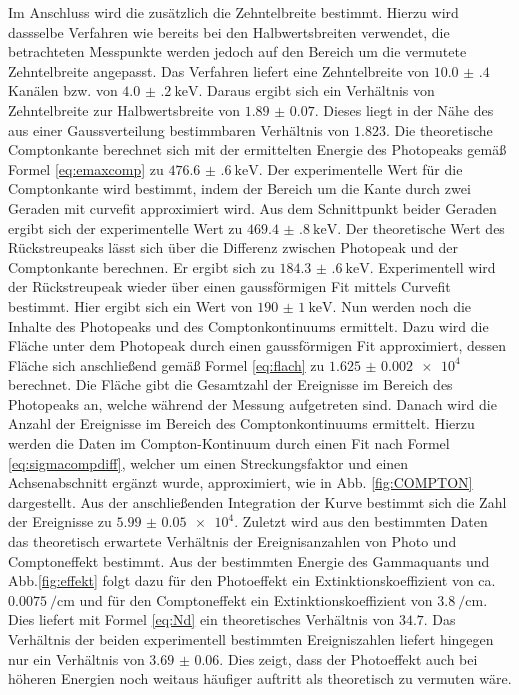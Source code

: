 Im Anschluss wird die zusätzlich die Zehntelbreite bestimmt. Hierzu wird dassselbe Verfahren wie bereits bei den Halbwertsbreiten verwendet, die betrachteten Messpunkte werden jedoch auf den Bereich um die vermutete Zehntelbreite angepasst. Das Verfahren liefert eine Zehntelbreite von $\num{10.0(4)}$ Kanälen bzw. von $\SI{4.0(2)}{\kilo\electronvolt}$. Daraus ergibt sich ein Verhältnis von Zehntelbreite zur Halbwertsbreite von $\num{1.89(7)}$. Dieses liegt in der Nähe des aus einer Gaussverteilung bestimmbaren Verhältnis von $\num{1.823}$\cite{V18}. Die theoretische Comptonkante berechnet sich mit der ermittelten Energie des Photopeaks gemäß Formel \eqref{eq:emaxcomp} zu $\SI{476.6(6)}{\kilo\electronvolt}$. Der experimentelle Wert für die Comptonkante wird bestimmt, indem der Bereich um die Kante durch zwei Geraden mit curvefit\cite{V18} approximiert wird. Aus dem Schnittpunkt beider Geraden ergibt sich der experimentelle Wert zu $\SI{469.4(8)}{\kilo\electronvolt}$. Der theoretische Wert des Rückstreupeaks lässt sich über die Differenz zwischen Photopeak und der Comptonkante berechnen. Er ergibt sich zu $\SI{184.3(6)}{\kilo\electronvolt}$. Experimentell wird der Rückstreupeak wieder über einen gaussförmigen Fit mittels Curvefit bestimmt. Hier ergibt sich ein Wert von $\SI{190(1)}{\kilo\electronvolt}$. Nun werden noch die Inhalte des Photopeaks und des Comptonkontinuums ermittelt. Dazu wird die Fläche unter dem Photopeak durch einen gaussförmigen Fit approximiert, dessen Fläche sich anschließend gemäß Formel \eqref{eq:flach} zu $\num{1.625(2)e4}$ berechnet. Die Fläche gibt die Gesamtzahl der Ereignisse im Bereich des Photopeaks an, welche während der Messung aufgetreten sind. Danach wird die Anzahl der Ereignisse im Bereich des Comptonkontinuums ermittelt. Hierzu werden die Daten im Compton-Kontinuum durch einen Fit nach Formel \eqref{eq:sigmacompdiff}, welcher um einen Streckungsfaktor und einen Achsenabschnitt ergänzt wurde, approximiert, wie in Abb. \ref{fig:COMPTON} dargestellt. Aus der anschließenden Integration der Kurve bestimmt sich die Zahl der Ereignisse zu $\num{5.99(5)e4}$. Zuletzt wird aus den bestimmten Daten das theoretisch erwartete Verhältnis der Ereignisanzahlen von Photo und Comptoneffekt bestimmt. Aus der bestimmten Energie des Gammaquants und Abb.\ref{fig:effekt} folgt dazu für den Photoeffekt ein Extinktionskoeffizient von ca. $\SI{0.0075}{\per\centi\meter}$ und für den Comptoneffekt ein Extinktionskoeffizient von $\SI{3.8}{\per\centi\meter}$. Dies liefert mit Formel \eqref{eq:Nd} ein theoretisches Verhältnis von $34.7$. Das Verhältnis der beiden experimentell bestimmten Ereigniszahlen liefert hingegen nur ein Verhältnis von $\num{3.69(6)}$. Dies zeigt, dass der Photoeffekt auch bei höheren Energien noch weitaus häufiger auftritt als theoretisch zu vermuten wäre. 







